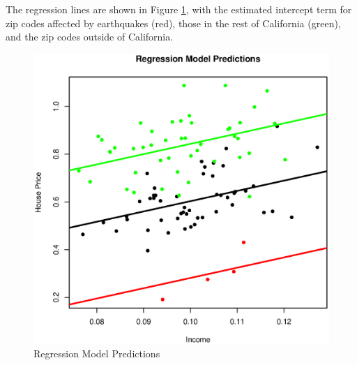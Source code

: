 \documentclass{paper}
\begin{document}
The regression lines are shown in Figure \ref{fig:reg}, with the estimated intercept term for zip codes affected by earthquakes (red), those in the rest of California (green), and the zip codes outside of California. 

\begin{figure}
\centering
\includegraphics[width=\textwidth]{../Figures/regression.eps}
\caption{Regression Model Predictions}
\label{fig:reg}
\end{figure}





\end{document}
